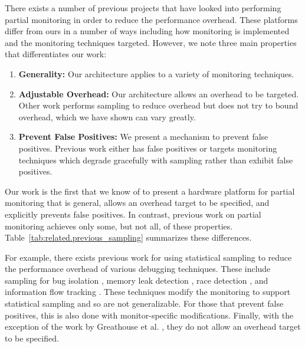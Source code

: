 There exists a number of previous projects that have looked into performing
partial monitoring in order to reduce the performance overhead. These
platforms differ from ours in a number of ways including how monitoring is
implemented and the monitoring techniques targeted. However, we note three main
properties that differentiates our work:
\begin{enumerate}
  \item \textbf{Generality:} Our architecture applies to a variety of monitoring techniques.
  \item \textbf{Adjustable Overhead:} Our architecture allows an overhead to be
  targeted. Other work performs sampling to reduce overhead but does not try
  to bound overhead, which we have shown can vary greatly.
  \item \textbf{Prevent False Positives:} We present a mechanism to prevent
  false positives. Previous work either has false positives or targets monitoring
  techniques which degrade gracefully with sampling rather than exhibit false
  positives.
\end{enumerate}
Our work is the first that we know of to present a hardware platform for partial
monitoring that is general, allows an overhead target to be specified, and
explicitly prevents false positives. In contrast, previous work on
partial monitoring achieves only some, but not all, of these properties.
Table~\ref{tab:related.previous_sampling} summarizes these differences. 

For example, there exists previous work for using statistical sampling to
reduce the performance overhead of various debugging techniques. These include
sampling for bug isolation \cite{liblit-pldi05}, memory leak detection
\cite{chilimbi-asplos04}, race detection \cite{literace-pldi09, pacer-pldi10},
and information flow tracking \cite{testudo-micro08, greathouse-cgo11}. These
techniques modify the monitoring to support statistical sampling and so are not
generalizable. For those that prevent false positives, this is also done with
monitor-specific modifications. Finally, with the exception of the work by
Greathouse et al. \cite{greathouse-cgo11}, they do not allow an overhead target
to be specified.

